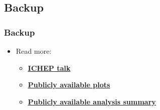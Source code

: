 \documentclass[bigger]{beamer}
\providecommand{\alert}[1]{\textbf{#1}}
\begin{document}
\subsection{Backup}
\label{sec-7-1}
\begin{frame}
\frametitle{Backup}
\label{sec-7-1-1}
\begin{itemize}

\item Read more:
\label{sec-7-1-1-1}%
\begin{itemize}

\item \href{http://indico.ific.uv.es/indico/materialDisplay.py?contribId=1023&sessionId=24&materialId=slides&confId=2025}{\alert{\underline{ICHEP talk}}}
\label{sec-7-1-1-1-1}%

\item \href{https://twiki.cern.ch/twiki/bin/view/CMSPublic/PhysicsResultsEXO12041}{\alert{\underline{Publicly available plots}}}
\label{sec-7-1-1-1-2}%

\item \href{http://inspirehep.net/record/1305762}{\alert{\underline{Publicly available analysis summary}}}
\label{sec-7-1-1-1-3}%
\end{itemize} %
\end{itemize} %
\end{frame}
\end{document}
